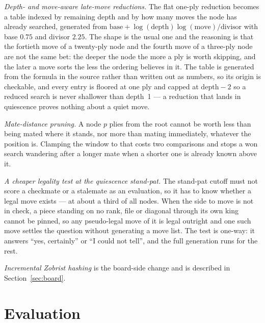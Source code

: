 \documentclass[11pt,a4paper]{article}
\begin{document}
\emph{Depth- and move-aware late-move reductions.} The flat one-ply reduction becomes a table indexed
by remaining depth and by how many moves the node has already searched, generated from
$\mathrm{base} + \log(\mathrm{depth})\log(\mathrm{move})/\mathrm{divisor}$ with base $0.75$ and
divisor $2.25$. The shape is the usual one and the reasoning is that the fortieth move of a
twenty-ply node and the fourth move of a three-ply node are not the same bet: the deeper the node the
more a ply is worth skipping, and the later a move sorts the less the ordering believes in it. The
table is generated from the formula in the source rather than written out as numbers, so its origin
is checkable, and every entry is floored at one ply and capped at $\mathrm{depth}-2$ so a reduced
search is never shallower than depth~1 --- a reduction that lands in quiescence proves nothing about
a quiet move.

\emph{Mate-distance pruning.} A node $p$ plies from the root cannot be worth less than being mated
where it stands, nor more than mating immediately, whatever the position is. Clamping the window to
that costs two comparisons and stops a won search wandering after a longer mate when a shorter one is
already known above it.

\emph{A cheaper legality test at the quiescence stand-pat.} The stand-pat cutoff must not score a
checkmate or a stalemate as an evaluation, so it has to know whether a legal move exists --- at about
a third of all nodes. When the side to move is not in check, a piece standing on no rank, file or
diagonal through its own king cannot be pinned, so any pseudo-legal move of it is legal outright and
one such move settles the question without generating a move list. The test is one-way: it answers
``yes, certainly'' or ``I could not tell'', and the full generation runs for the rest.

\emph{Incremental Zobrist hashing} is the board-side change and is described in
Section~\ref{sec:board}.

\section{Evaluation}\label{sec:eval}
\end{document}
